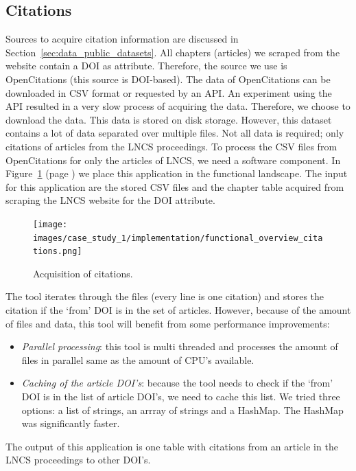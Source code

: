 \documentclass{ou-report}
\newcommand{\doi}{{DOI}}
\newcommand{\lncs}{LNCS}
\begin{document}
\subsection{Citations}
Sources to acquire citation information are discussed in
Section~\ref{sec:data_public_datasets}. All chapters (articles) we scraped 
from the website contain a \doi{} as attribute. Therefore, the source we use
is OpenCitations (this source is \doi{}-based).
%
The data of OpenCitations can be downloaded in CSV format or requested by an
API. An experiment using the API resulted in a very slow process of acquiring
the data. Therefore, we choose to download the data. This data is stored on disk
storage. However, this dataset contains a lot of data separated over multiple 
files. Not all data is required; only citations of articles from the \lncs{} 
proceedings. 
%
To process the CSV files from OpenCitations for only the articles of \lncs{}, we 
need a software component. In Figure~\ref{fig:functional_overview_citations}
(page \pageref{fig:functional_overview_citations}) we
place this application in the functional landscape.
The input for this application are the stored CSV files and the chapter table 
acquired from scraping the \lncs{} website for the \doi{} attribute.

\begin{figure}[ht]
    \centering
    \texttt{[image: images/case\_study\_1/implementation/functional\_overview\_citations.png]}
    \caption{Acquisition of citations.}
    \label{fig:functional_overview_citations}
\end{figure}

The tool iterates through the files (every line is
one citation) and stores the citation if the `from' \doi{} is in the set of 
articles. However, because of the amount of files and data, this tool will 
benefit from some performance improvements:
\begin{itemize}
    \item \emph{Parallel processing}: this tool is multi threaded and processes
    the amount of files in parallel same as the amount of CPU's available.
    \item \emph{Caching of the article \doi{}'s}: because the tool needs to
    check if the `from' \doi{} is in the list of article \doi{}'s, we need to
    cache this list. We tried three options: a list of strings, an arrray of
    strings and a HashMap. The HashMap was significantly faster.
\end{itemize}

The output of this application is one table with citations from an article in 
the \lncs{} proceedings to other \doi{}'s.
\end{document}
